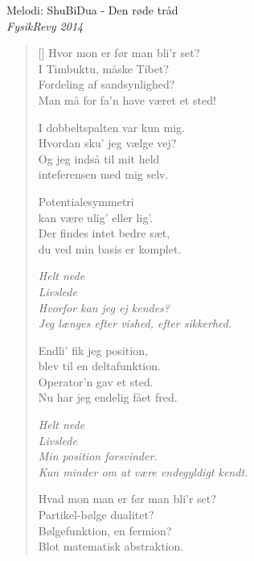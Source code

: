 {Melodi: ShuBiDua - Den røde tråd}\\[.2em]
{\small\itshape FysikRevy 2014}

\begin{multicols}{2}
\settowidth{\versewidth}{Kun minder om at være endegyldigt kendt.}
\begin{verse}[\versewidth]
Hvor mon er før man bli'r set?\\
I Timbuktu, måske Tibet?\\
Fordeling af sandsynlighed?\\
Man må for fa'n have været et sted!

I dobbeltspalten var kun mig.\\
Hvordan sku' jeg vælge vej?\\
Og jeg indså til mit held\\
inteferensen med mig selv.

Potentialesymmetri\\
kan være ulig' eller lig'.\\
Der findes intet bedre sæt,\\
du ved min basis er komplet.

\columnbreak
\emph{Helt nede\\
Livslede\\
Hvorfor kan jeg ej kendes?\\
Jeg længes efter vished, efter sikkerhed.}

Endli' fik jeg position,\\
blev til en deltafunktion.\\
Operator'n gav et sted.\\
Nu har jeg endelig fået fred.

\emph{Helt nede\\
Livslede\\
Min position forsvinder.\\
Kun minder om at være endegyldigt kendt.}

Hvad mon man er før man bli'r set?\\
Partikel-bølge dualitet?\\
Bølgefunktion, en fermion?\\
Blot matematisk abstraktion.
\end{verse}
\end{multicols}
\newpage



